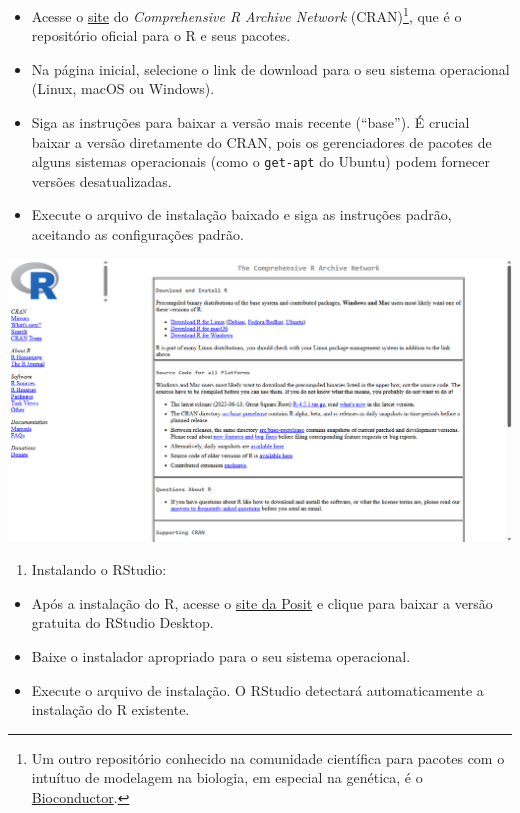 \documentclass[
  12pt,
  letterpaper,
  DIV=11,
  numbers=noendperiod]{scrreprt}
\providecommand{\tightlist}{%
  \setlength{\itemsep}{0pt}\setlength{\parskip}{0pt}}\usepackage{longtable,booktabs,array}
\theoremstyle{definition}
\theoremstyle{exemplo}
\begin{document}
\begin{itemize}
\tightlist
\item
  Acesse o \href{https://cran.r-project.org/}{site} do
  \emph{Comprehensive R Archive Network} (CRAN)\footnote{Um outro
    repositório conhecido na comunidade científica para pacotes com o
    intuítuo de modelagem na biologia, em especial na genética, é o
    \href{https://www.bioconductor.org/}{Bioconductor}.}, que é o
  repositório oficial para o R e seus pacotes.
\item
  Na página inicial, selecione o link de download para o seu sistema
  operacional (Linux, macOS ou Windows).
\item
  Siga as instruções para baixar a versão mais recente (``base''). É
  crucial baixar a versão diretamente do CRAN, pois os gerenciadores de
  pacotes de alguns sistemas operacionais (como o \texttt{get-apt} do
  Ubuntu) podem fornecer versões desatualizadas.
\item
  Execute o arquivo de instalação baixado e siga as instruções padrão,
  aceitando as configurações padrão.
\end{itemize}

\includegraphics{images/clipboard-2887599601.png}

\begin{enumerate}
\def\labelenumi{\arabic{enumi}.}
\setcounter{enumi}{1}
\tightlist
\item
  Instalando o RStudio:
\end{enumerate}

\begin{itemize}
\tightlist
\item
  Após a instalação do R, acesse o
  \href{https://posit.co/download/rstudio-desktop/}{site da Posit} e
  clique para baixar a versão gratuita do RStudio Desktop.
\item
  Baixe o instalador apropriado para o seu sistema operacional.
\item
  Execute o arquivo de instalação. O RStudio detectará automaticamente a
  instalação do R existente.
\end{itemize}
\end{document}
